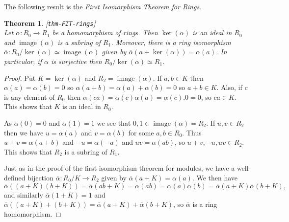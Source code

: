 \documentclass{amsart}
\newcommand{\lbl}[1]{\label{#1}\textup{[\texttt{#1}]}\ \\}
\newcommand{\lbl}{\label}
\newcommand{\img}       {\operatorname{image}}
\newcommand{\al}        {\alpha}
\newcommand{\alb}       {\overline{\alpha}}
\newcommand{\xra}       {\xrightarrow}
\renewcommand{\:}{\colon}
\newtheorem{theorem}{Theorem}[section]
\theoremstyle{definition}
\begin{document}
The following result is the \emph{First Isomorphism Theorem for Rings}.
\begin{theorem}\lbl{thm-FIT-rings}
 Let $\al\:R_0\xra{}R_1$ be a homomorphism of rings.  Then $\ker(\al)$
 is an ideal in $R_0$ and $\img(\al)$ is a subring of $R_1$.
 Moreover, there is a ring isomorphism
 $\alb\:R_0/\ker(\al)\simeq\img(\al)$ given by
 $\alb(a+\ker(\al))=\al(a)$.  In particular, if $\al$ is surjective
 then $R_0/\ker(\al)\simeq R_1$.
\end{theorem}
\begin{proof}
 Put $K=\ker(\al)$ and $R_2=\img(\al)$.  If $a,b\in K$ then
 $\al(a)=\al(b)=0$ so $\al(a+b)=\al(a)+\al(b)=0$ so $a+b\in K$.  Also,
 if $c$ is any element of $R_0$ then
 $\al(ca)=\al(c)\al(a)=\al(c).0=0$, so $ca\in K$.  This shows that $K$
 is an ideal in $R_0$.

 As $\al(0)=0$ and $\al(1)=1$ we see that $0,1\in\img(\al)=R_2$.  If
 $u,v\in R_2$ then we have $u=\al(a)$ and $v=\al(b)$ for some
 $a,b\in R_0$.  Thus $u+v=\al(a+b)$ and $-u=\al(-a)$ and $uv=\al(ab)$,
 so $u+v,-u,uv\in R_2$.  This shows that $R_2$ is a subring of $R_1$.

 Just as in the proof of the first isomorphism theorem for modules, we
 have a well-defined bijection $\alb\:R_0/K\xra{}R_2$ given by
 $\alb(a+K)=\al(a)$.  We then have
 \[ \alb((a+K)(b+K))=\alb(ab+K)=\al(ab)=
      \al(a)\al(b)=\alb(a+K)\alb(b+K),
 \]
 and similarly $\alb(1+K)=1$ and
 $\alb((a+K)+(b+K))=\alb(a+K)+\alb(b+K)$, so $\alb$ is a ring
 homomorphism.
\end{proof}
\end{document}
